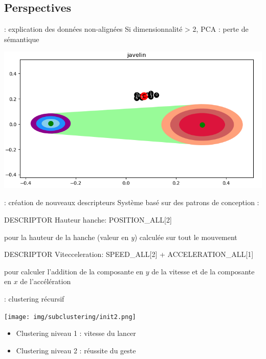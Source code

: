 \documentclass[svgnames]{beamer}
\begin{document}
	\subsection{Perspectives}
	\begin{frame}{\subsecname : explication des données non-alignées}
		Si dimensionnalité > 2, PCA : perte de sémantique
		
		\centering
			\includegraphics[scale=0.5]{img/non_aligned_default.png}
	\end{frame}
	
	\begin{frame}{\subsecname : création de nouveaux descripteurs}
		Système basé sur des patrons de conception :
		
		\begin{framed}
		DESCRIPTOR Hauteur hanche: POSITION\_ALL[2]
		\end{framed}
		pour la hauteur de la hanche (valeur en \textit{y}) calculée sur tout le mouvement\\

		\begin{framed}
		DESCRIPTOR Vitecceleration: SPEED\_ALL[2] + ACCELERATION\_ALL[1]
		\end{framed}
		pour calculer l'addition de la composante en $y$ de la vitesse et de la composante en $x$ de l'accélération\\
	\end{frame}
	
	\begin{frame}{\subsecname : clustering récursif}
		\begin{center}
			\texttt{[image: img/subclustering/init2.png]}
		\end{center}
		\begin{itemize}
			\item Clustering niveau 1 : vitesse du lancer
			\item Clustering niveau 2 : réussite du geste
		\end{itemize}
	\end{frame}
	
\end{document}
